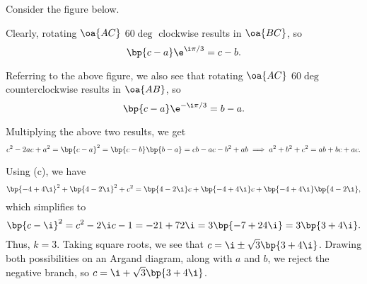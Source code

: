 \begin{solution}
    \begin{ppart}
        Consider the figure below.

        \begin{center}
        \end{center}

        Clearly, rotating $\oa{AC}$ 60$\deg$ clockwise results in $\oa{BC}$, so \[\bp{c-a} \e^{\i \pi / 3} = c - b.\]
    \end{ppart}
    \begin{ppart}
        Referring to the above figure, we also see that rotating $\oa{AC}$ 60$\deg$ counterclockwise results in $\oa{AB}$, so \[\bp{c - a} \e^{-\i \pi/3} = b - a.\]
    \end{ppart}
    \begin{ppart}
        Multiplying the above two results, we get \[c^2 - 2ac + a^2 = \bp{c-a}^2 = \bp{c-b}\bp{b-a} = cb - ac - b^2 + ab \implies a^2 + b^2 + c^2 = ab + bc + ac.\]
    \end{ppart}

    Using (c), we have \[\bp{-4 + 4\i}^2 + \bp{4 - 2\i}^2 + c^2 = \bp{4 - 2\i}c + \bp{-4 + 4\i} c + \bp{-4 + 4\i}\bp{4 - 2\i},\] which simplifies to \[\bp{c - \i}^2 = c^2 - 2\i c - 1 = -21 + 72\i = 3\bp{-7 + 24\i} = 3\bp{3 + 4\i}.\] Thus, $k = 3$. Taking square roots, we see that $c = \i \pm \sqrt{3} \bp{3 + 4\i}$. Drawing both possibilities on an Argand diagram, along with $a$ and $b$, we reject the negative branch, so $c = \i + \sqrt{3} \bp{3 + 4\i}$.

    \begin{center}
\end{center}
\end{solution}
